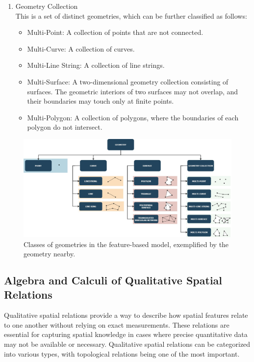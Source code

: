 \begin{enumerate}
    \item Geometry Collection \\
    This is a set of distinct geometries, which can be further classified as follows:
    
    \begin{itemize}
        \item Multi-Point: A collection of points that are not connected.
        \item Multi-Curve: A collection of curves.
        \item Multi-Line String: A collection of line strings.
        \item Multi-Surface: A two-dimensional geometry collection consisting of surfaces. The geometric interiors of two surfaces may not overlap, and their boundaries may touch only at finite points.
        \item Multi-Polygon: A collection of polygons, where the boundaries of each polygon do not intersect.
    \end{itemize}

\end{enumerate}

\begin{figure}[h!tb]
    \centerline {\includegraphics[width=\textwidth]{img/Geometries.jpg}}
    \caption{Classes of geometries in the feature-based model, exemplified by the geometry nearby.}
    \label{fig:example_geometries}
\end{figure}

\subsection{Algebra and Calculi of Qualitative Spatial Relations}\label{II-subsec:algebraCalculi}

Qualitative spatial relations provide a way to describe how spatial features relate to one another without relying on exact measurements. These relations are essential for capturing spatial knowledge in cases where precise quantitative data may not be available or necessary. Qualitative spatial relations can be categorized into various types, with topological relations being one of the most important.

